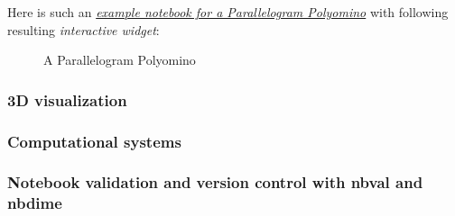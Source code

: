 \documentclass{deliverablereport}
\begin{document}
Here is such an \href{https://mybinder.org/v2/gh/nheir/sage-combinat-widgets/example_parapolyomino}{\emph{example notebook for a Parallelogram Polyomino}} with following resulting \emph{interactive widget}:

\begin{figure}[ht]
\caption*{A Parallelogram Polyomino}
\end{figure}

\subsubsection{3D visualization}

\subsubsection{Computational systems}

\subsubsection{Notebook validation and version control with nbval and nbdime}
\end{document}
